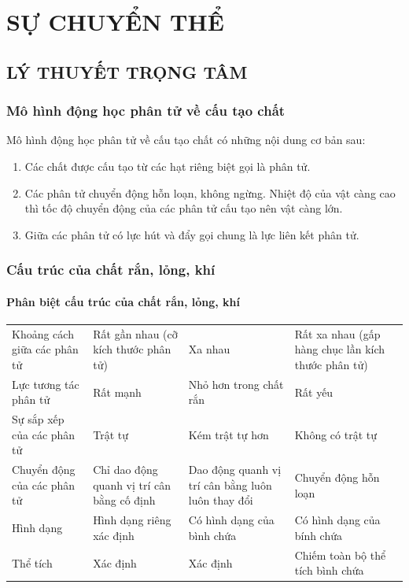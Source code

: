 \setcounter{section}{0}
\section{SỰ CHUYỂN THỂ}
\subsection{LÝ THUYẾT TRỌNG TÂM}
\subsubsection{Mô hình động học phân tử về cấu tạo chất}
\begin{boxdn}
	Mô hình động học phân tử về cấu tạo chất có những nội dung cơ bản sau:
	\begin{enumerate}[label=\arabic*.]
		\item Các chất được cấu tạo từ các hạt riêng biệt gọi là phân tử.
		\item Các phân tử chuyển động hỗn loạn, không ngừng. Nhiệt độ của vật càng cao thì tốc độ chuyển động của các phân tử cấu tạo nên vật càng lớn.
		\item Giữa các phân tử có lực hút và đẩy gọi chung là lực liên kết phân tử.
	\end{enumerate}
\end{boxdn}
\subsubsection{Cấu trúc của chất rắn, lỏng, khí}
\paragraph{Phân biệt cấu trúc của chất rắn, lỏng, khí}
\begin{center}
	\begin{tabular}{|p{4cm}|p{4cm}|p{4cm}|p{4cm}|}
		\hline
		\rowcolor{\nenVD}
		\thead{Đặc điểm}&\thead{Thể rắn} &\thead{Thể lỏng}&\thead{Thể khí}\\
		\hline
		Khoảng cách giữa các phân tử & Rất gần nhau (cỡ kích thước phân tử) & Xa nhau & Rất xa nhau (gấp hàng chục lần kích thước phân tử)\\
		\hline
		Lực tương tác phân tử & Rất mạnh & Nhỏ hơn trong chất rắn & Rất yếu\\
		\hline
		Sự sắp xếp của các phân tử & Trật tự & Kém trật tự hơn & Không có trật tự\\
		\hline
		Chuyển động của các phân tử & Chỉ dao động quanh vị trí cân bằng cố định & Dao động quanh vị trí cân bằng luôn luôn thay đổi & Chuyển động hỗn loạn \\
		\hline
		Hình dạng & Hình dạng riêng xác định & Có hình dạng của bình chứa & Có hình dạng của bính chứa\\
		\hline
		Thể tích & Xác định & Xác định & Chiếm toàn bộ thể tích bình chứa\\
		\hline
	\end{tabular}
\end{center}
